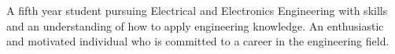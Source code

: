 \documentclass[10pt]{article}
\begin{document}
%
\begin{center}
\begin{minipage}{0.92\textwidth}
	\raggedright
		\normalsize{A fifth year student pursuing Electrical and Electronics Engineering with skills and an understanding of how to apply {engineering} knowledge. An enthusiastic and motivated individual who is committed to a career in the engineering field.}
\end{minipage}
\end{center}

\end{document}
